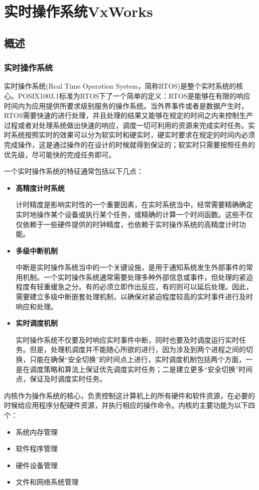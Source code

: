 \chapter{实时操作系统VxWorks}

\section{概述}

\subsection{实时操作系统}
实时操作系统(Real Time Operation System，简称RTOS)是整个实时系统的核心。POSIX1003.1标准为RTOS下了一个简单的定义：RTOS是能够在有限的响应时间内为应用提供所要求级别服务的操作系统\cite{Renard20081003}。当外界事件或者是数据产生时，RTOS需要快速的进行处理，并且处理的结果又能够在规定的时间之内来控制生产过程或者对处理系统做出快速的响应，调度一切可利用的资源来完成实时任务。实时系统按照实时的效果可以分为软实时和硬实时，硬实时要求在规定的时间内必须完成操作，这是通过操作的在设计的时候就得到保证的；软实时只需要按照任务的优先级，尽可能快的完成任务即可。

一个实时操作系统的特征通常包括以下几点：
\begin{itemize}
\item \textbf{高精度计时系统} 

计时精度是影响实时性的一个重要因素，在实时系统当中，经常需要精确确定实时地操作某个设备或执行某个任务，或精确的计算一个时间函数。这些不仅仅依赖于一些硬件提供的时钟精度，也依赖于实时操作系统的高精度计时功能。
\item \textbf{多级中断机制}

中断是实时操作系统当中的一个关键设施，是用于通知系统发生外部事件的常用机制。一个实时操作系统通常需要处理多种外部信息或事件，但处理的紧迫程度有轻重缓急之分。有的必须立即作出反应，有的则可以延后处理。因此，需要建立多级中断嵌套处理机制，以确保对紧迫程度较高的实时事件进行及时响应和处理。
\item \textbf{实时调度机制} 

实时操作系统不仅要及时响应实时事件中断，同时也要及时调度运行实时任务。但是，处理机调度并不能随心所欲的进行，因为涉及到两个进程之间的切换，只能在确保“安全切换”的时间点上进行，实时调度机制包括两个方面，一是在调度策略和算法上保证优先调度实时任务；二是建立更多“安全切换”时间点，保证及时调度实时任务。
\end{itemize}

	内核作为操作系统的核心，负责控制这计算机上的所有硬件和软件资源，在必要的时候给应用程序分配硬件资源，并执行相应的操作命令。内核的主要功能为以下四个：
\begin{itemize}
\item 系统内存管理
\item 软件程序管理
\item 硬件设备管理
\item 文件和网络系统管理
\end{itemize}


